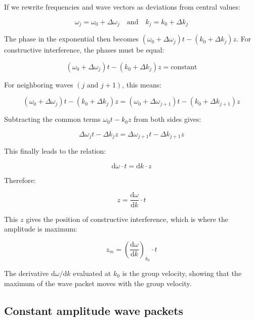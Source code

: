 \documentclass[
  a4paper,
]{book}
\begin{document}
\begin{tcolorbox}[enhanced jigsaw, coltitle=black, title=\textcolor{quarto-callout-note-color}{\faInfo}\hspace{0.5em}{Position of Maximum Amplitude}, colframe=quarto-callout-note-color-frame, toprule=.15mm, opacitybacktitle=0.6, left=2mm, opacityback=0, breakable, toptitle=1mm, bottomtitle=1mm, leftrule=.75mm, arc=.35mm, titlerule=0mm, colbacktitle=quarto-callout-note-color!10!white, rightrule=.15mm, bottomrule=.15mm, colback=white]

If we rewrite frequencies and wave vectors as deviations from central
values:

\[\omega_j = \omega_0 + \Delta \omega_j \quad \text{and} \quad k_j = k_0 + \Delta k_j\]

The phase in the exponential then becomes
\((\omega_0 + \Delta \omega_j)t - (k_0 + \Delta k_j)z\). For
constructive interference, the phases must be equal:

\[(\omega_0 + \Delta \omega_j)t - (k_0 + \Delta k_j)z = \text{constant}\]

For neighboring waves \((j \text{ and } j+1)\), this means:

\[(\omega_0 + \Delta \omega_j)t - (k_0 + \Delta k_j)z = (\omega_0 + \Delta \omega_{j+1})t - (k_0 + \Delta k_{j+1})z\]

Subtracting the common terms \(\omega_0t - k_0z\) from both sides gives:

\[\Delta\omega_j t - \Delta k_j z = \Delta\omega_{j+1} t - \Delta k_{j+1} z\]

This finally leads to the relation:

\[\mathrm{d}\omega \cdot t = \mathrm{d}k \cdot z\]

Therefore:

\[z = \frac{\mathrm{d}\omega}{\mathrm{d}k} \cdot t\]

This \(z\) gives the position of constructive interference, which is
where the amplitude is maximum:

\[z_m = \left(\frac{\mathrm{d}\omega}{\mathrm{d}k}\right)_{k_0} \cdot t\]

The derivative \(\mathrm{d}\omega/\mathrm{d}k\) evaluated at \(k_0\) is
the group velocity, showing that the maximum of the wave packet moves
with the group velocity.

\end{tcolorbox}

\subsection{Constant amplitude wave
packets}\label{constant-amplitude-wave-packets}
\end{document}
